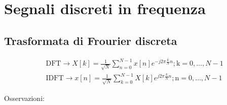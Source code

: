 \section{Segnali discreti in frequenza}
\subsection{Trasformata di Frourier discreta}
\begin{align*}
	 & \text{DFT} \rightarrow X[k]=\frac{1}{\sqrt{N}} \sum_{n=0}^{N-1} x[n] e^{-j 2 \pi \frac{k}{N} n} ; \mathrm{k}=0, \ldots, N -1 \\
	 & \text{IDFT} \rightarrow x[n]=\frac{1}{\sqrt{N}} \sum_{k=0}^{N-1} X[k] e^{j 2 \pi \frac{k}{N} n} ; \mathrm{n}=0, \ldots, N-1
\end{align*}

Osservazioni:
